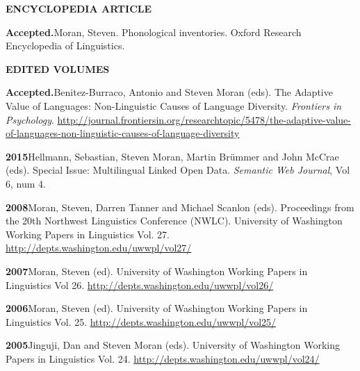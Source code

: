 \documentclass[11pt]{article}
\newcommand{\hangpara}{
 \setlength{\parindent}{0in} %
 \hangindent=0.42in %
}
\begin{document}


\vskip 20pt
\begin{flushleft}
{\bf ENCYCLOPEDIA ARTICLE}
\end{flushleft}

\hangpara
{\bf Accepted.}\hspace{1ex}Moran, Steven. Phonological inventories. Oxford Research Encyclopedia of Linguistics.

\vskip 20pt
\begin{flushleft}
{\bf EDITED VOLUMES}
\end{flushleft}

\hangpara
{\bf Accepted.}\hspace{1ex}Benitez-Burraco, Antonio and Steven Moran (eds). The Adaptive Value of Languages: Non-Linguistic Causes of Language Diversity. {\it Frontiers in Psychology}. \url{http://journal.frontiersin.org/researchtopic/5478/the-adaptive-value-of-languages-non-linguistic-causes-of-language-diversity}

\hangpara
\vskip 6pt
{\bf 2015}\hspace{1ex}Hellmann, Sebastian, Steven Moran, Martin Br{\"u}mmer and John McCrae (eds). Special Issue: Multilingual Linked Open Data. {\it Semantic Web Journal}, Vol 6, num 4.

\vskip 6pt
\hangpara
{\bf 2008}\hspace{1ex}Moran, Steven, Darren Tanner and Michael Scanlon (eds). Proceedings from the 20th Northwest Linguistics Conference (NWLC). University of Washington Working Papers in Linguistics Vol. 27. \url{http://depts.washington.edu/uwwpl/vol27/}

\vskip 6pt
\hangpara
{\bf 2007}\hspace{1ex}Moran, Steven (ed). University of Washington Working Papers in Linguistics Vol 26. \url{http://depts.washington.edu/uwwpl/vol26/}

\vskip 6pt
\hangpara
{\bf 2006}\hspace{1ex}Moran, Steven (ed). University of Washington Working Papers in Linguistics Vol. 25. \url{http://depts.washington.edu/uwwpl/vol25/}

\vskip 6pt
\hangpara
{\bf 2005}\hspace{1ex}Jinguji, Dan and Steven Moran (eds). University of Washington Working Papers in Linguistics Vol. 24. \url{http://depts.washington.edu/uwwpl/vol24/}
\end{document}
